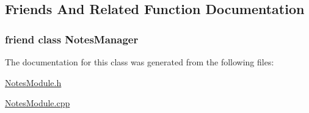 \subsection{Friends And Related Function Documentation}
\hypertarget{class_notes_module_1_1_article_a017a5144e8cfa6087305055ab968ef41}{
\subsubsection[{Notes\-Manager}]{\setlength{\rightskip}{0pt plus 5cm}friend class Notes\-Manager\hspace{0.3cm}{\ttfamily [friend]}}}\label{class_notes_module_1_1_article_a017a5144e8cfa6087305055ab968ef41}


The documentation for this class was generated from the following files\-:\begin{DoxyCompactItemize}
\item 
\hyperlink{_notes_module_8h}{Notes\-Module.\-h}\item 
\hyperlink{_notes_module_8cpp}{Notes\-Module.\-cpp}\end{DoxyCompactItemize}
